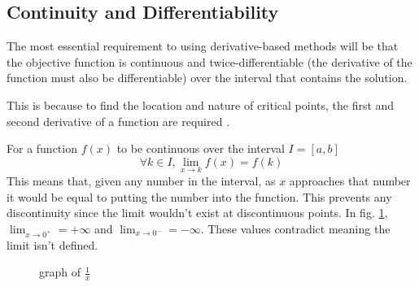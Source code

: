 \documentclass[10pt,a4paper]{report}
\begin{document}
			\subsection{Continuity and Differentiability}
				The most essential requirement to using derivative-based methods will be that the objective
				function is continuous and twice-differentiable (the derivative of the function must also be differentiable)
				over the interval that contains the solution. \par
				This is because to find the location and nature of critical points, the first and second derivative
				of a function are required \autocite{SecondDerivativeTest}. \par


				For a function $f(x)$ to be continuous over the interval $I = [a,b]$
				\begin{equation}
					\forall k \in I, \lim_{x \to k} f(x) = f(k)
					\label{eq:continuity}
				\end{equation}
				This means that, given any number in the interval, as $x$ approaches that number it would be equal to putting
				the number into the function. This prevents any discontinuity since the limit wouldn't exist at discontinuous points. In fig. \ref{fig:discontinuity},
				$\lim_{x \to 0^+} = +\infty$ and $\lim_{x \to 0^-} = -\infty$. These values contradict meaning the limit isn't defined.
				\begin{figure}[h]
					\centering
					\caption{graph of $\frac{1}{x}$}
					\label{fig:discontinuity}
				\end{figure}
\end{document}
